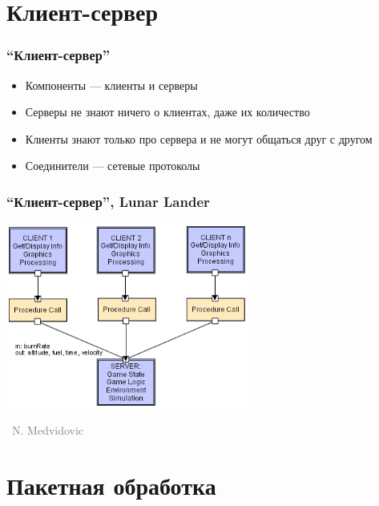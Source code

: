 \documentclass[xetex,mathserif,serif]{beamer}
\newcommand{\attribution}[1] {
	\vspace{-5mm}\begin{flushright}\begin{scriptsize}\textcolor{gray}{\textcopyright\, #1}\end{scriptsize}\end{flushright}
}
\begin{document}
	\section{Клиент-сервер}

	\begin{frame}
		\frametitle{``Клиент-сервер''}
		\begin{itemize}
			\item Компоненты --- клиенты и серверы
			\item Серверы не знают ничего о клиентах, даже их количество
			\item Клиенты знают только про сервера и не могут общаться друг с другом
			\item Соединители --- сетевые протоколы
		\end{itemize}
	\end{frame}

	\begin{frame}
		\frametitle{``Клиент-сервер'', Lunar Lander}
		\begin{center}
			\includegraphics[width=0.6\textwidth]{clientServerLL.png}
			\attribution{N. Medvidovic}
		\end{center}
	\end{frame}

	\section{Пакетная обработка}
\end{document}
